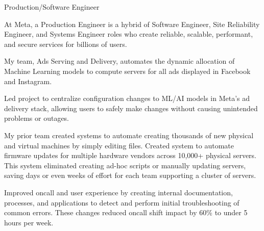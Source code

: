 \documentclass[letterpaper,MMMMyyyy,nonstopmode]{simpleresumecv}
\begin{document}
\begin{Body}
Production/Software Engineer

\begin{Detail}

At Meta, a Production Engineer is a hybrid of Software Engineer, Site Reliability Engineer, and Systems Engineer roles
who create reliable, scalable, performant, and secure services for billions of users.

\Gap

My team, Ads Serving and Delivery, automates the dynamic allocation of Machine Learning models to compute servers for all ads displayed in Facebook and Instagram.


\BulletItem
Led project to centralize configuration changes to ML/AI models in Meta's ad delivery stack, allowing users to safely make changes without causing unintended problems or outages.

\Gap
My prior team created systems to automate creating thousands of new physical and virtual machines by simply editing files. 
\BulletItem
Created system to automate firmware updates for multiple hardware vendors across 10,000+ physical servers. 
This system eliminated creating ad-hoc scripts or manually updating servers, saving days or even weeks of effort for each team supporting a cluster of servers.

\BulletItem
Improved oncall and user experience by creating internal documentation, processes, and applications to detect and perform initial troubleshooting of common errors.
These changes reduced oncall shift impact by 60\% to under 5 hours per week.



\end{Detail}
\end{Body}
\end{document}
